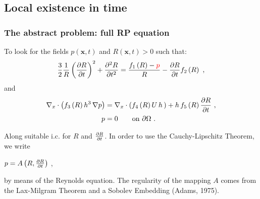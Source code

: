 \documentclass[10pt,aspectratio=169]{beamer}
\begin{document}

\subsection{Local existence in time}
\setcounter{showSlideNumbers}{0}
\begin{frame}[noframenumbering]
\tableofcontents[
currentsection,
currentsubsection,
subsectionstyle=show/shaded/hide
]
\end{frame}
\setcounter{showSlideNumbers}{1}


\begin{frame}
\frametitle{The abstract problem: full RP equation}\vspace*{0.5cm}
To look for the fields $p(\mathbf{x},t)$ and $R(\mathbf{x},t)>0$ such that:
\begin{equation*}
\frac{3}{2}\frac{1}{R}\left(\frac{\partial R}{\partial t}\right)^2+\frac{\partial^2 R}{\partial t^2}=\frac{f_1\left(R\right)-{\color{red}p}}{R}-\frac{\partial R}{\partial t}f_2\left(R\right)~,
\end{equation*}
and
\begin{align*}
\begin{split}
\nabla_x\cdot \left(f_3\left(R\right) h^3\,\nabla p\right)&=\nabla_x\cdot \left(f_4\left(R\right)U\,h\,\right)+h\,f_5\left(R\right)\frac{\partial R}{\partial t}~,\\
p&=0 \qquad\mbox{on } \partial \Omega~.
\end{split}
\end{align*}

Along suitable i.c. for $R$ and $\frac{\partial R}{\partial t}$. In order to use the Cauchy-Lipschitz Theorem, we write
\begin{center}
 {\color{red}$p=A\left(R,\frac{\partial R}{\partial t}\right)$} ,
\end{center}
by means of the Reynolds equation. The regularity of the mapping $A$ comes from the Lax-Milgram Theorem and a Sobolev Embedding (Adams, 1975).
\end{frame} 

\end{document}
